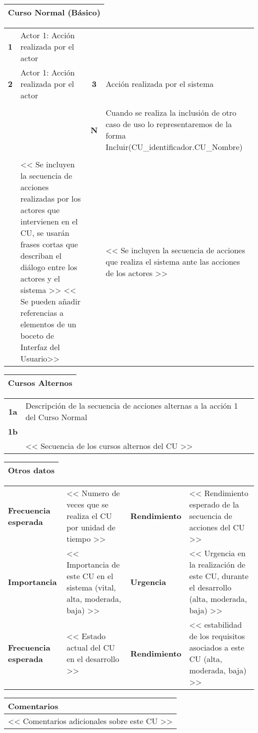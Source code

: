 \documentclass[11pt,a4paper]{article}
\begin{document}
\begin{table}[H]
	\begin{tabularx}{\textwidth}{X}
		\textbf{Curso Normal (Básico)}\\ \hline
	\end{tabularx}
	\begin{tabularx}{\textwidth}{cXcX}
		\textbf{1} & Actor 1: Acción realizada por el actor & & \\
		\textbf{2} & Actor 1: Acción realizada por el actor & \textbf{3} & Acción realizada por el sistema \\
		 & & & \\
		 & & \textbf{N} &  Cuando se realiza la inclusión de otro caso de uso lo representaremos de la forma Incluir(CU\_identificador.CU\_Nombre)\\
		 & & & \\
		 & << Se incluyen la secuencia de acciones realizadas por los actores que intervienen en el CU, se usarán frases cortas que describan el diálogo entre los actores y el sistema >> << Se pueden añadir referencias a elementos de un boceto de Interfaz del Usuario>> & & << Se incluyen la secuencia de acciones que realiza el sistema ante las acciones de los actores >>
	\end{tabularx}
\end{table}

\begin{table}[H]
	\begin{tabularx}{\textwidth}{X}
		\textbf{Cursos Alternos}\\ \hline
	\end{tabularx}
	\begin{tabularx}{\textwidth}{cX}
		\textbf{1a} & Descripción de la secuencia de acciones alternas a la acción 1 del Curso Normal\\
		\textbf{1b} & \\
		 & << Secuencia de los cursos alternos del CU >>
	\end{tabularx}
	\begin{tabularx}{\textwidth}{X}
		\textbf{Otros datos}\\ \hline
	\end{tabularx}
	\begin{tabularx}{\textwidth}{lXlX}
		\textbf{Frecuencia esperada} & << Numero de veces que se realiza el CU por unidad de tiempo >> & \textbf{Rendimiento} & << Rendimiento esperado de la secuencia de acciones del CU >>\\
		\textbf{Importancia} & << Importancia de este CU en el sistema (vital, alta, moderada, baja) >> & \textbf{Urgencia} & << Urgencia en la realización de este CU, durante el desarrollo (alta, moderada, baja) >>\\
		\textbf{Frecuencia esperada} & << Estado actual del CU en el desarrollo >> & \textbf{Rendimiento} & << estabilidad de los requisitos asociados a este CU (alta, moderada, baja) >>\\
	\end{tabularx}
	\begin{tabularx}{\textwidth}{X}
		\textbf{Comentarios}\\ \hline
		<< Comentarios adicionales sobre este CU >>
	\end{tabularx}
\end{table}
	
	
\end{document}
